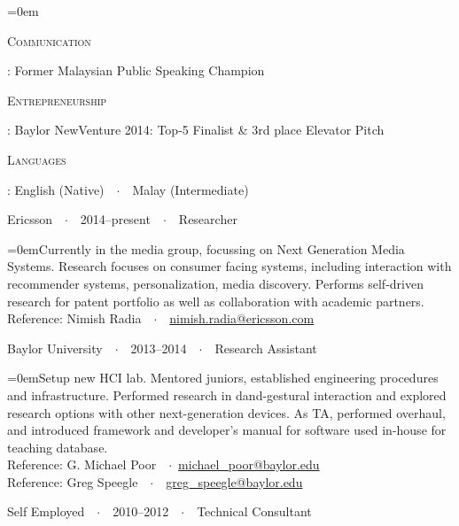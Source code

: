 \documentclass[a4paper]{scrartcl}
\newcommand{\Description}[1]{\hangindent=0em\hangafter=0\noindent\footnotesize{#1}\par\normalsize\vspace{1em}} %
\newcommand{\Redvline}[0]{\vspace{0em}\noindent{\color{ThemeColor}\rule{18cm}{0.4pt}}\vspace{-0.5em}}
\newcommand{\MyName}[1]{\noindent{\textsc{\LARGE{\color{ThemeColor}#1}}}} %
\newcommand{\NewBlock}[3]{
    #1\ \ $\cdotp$\ \ #2\ \ $\cdotp$\ \ #3}
\newcommand{\BlockTitle}[1]{\textsc{\vspace{0.15em}}\noindent{\spacedlowsmallcaps{#1}}\vspace{1em}}
\begin{document}
\Description{\parbox{\nontechskills}{\textsc{Communication}}: Former Malaysian Public Speaking Champion

\parbox{\nontechskills}{\textsc{Entrepreneurship}}: Baylor NewVenture 2014: Top-5 Finalist \& 3rd place Elevator Pitch

\parbox{\nontechskills}{\textsc{Languages}}: English (Native)\ \ $\cdotp$\ \ Malay (Intermediate)
}


\Redvline

\BlockTitle{Work Experience}

\NewBlock{Ericsson}{2014--present}{Researcher}

\Description{Currently in the media group, focussing on Next Generation Media Systems. Research focuses on consumer facing systems, including interaction with recommender systems, personalization, media discovery. Performs self-driven research for patent portfolio as well as collaboration with academic partners.
\\Reference: Nimish Radia\ \ $\cdotp$\ \ \href{mailto:nimish.radia@ericsson.com}{nimish.radia@ericsson.com}}

\NewBlock{Baylor University}{2013--2014}{Research Assistant}

\Description{Setup new HCI lab. Mentored juniors, established engineering procedures and infrastructure. Performed research in dand-gestural interaction and explored research options with other next-generation devices. As TA, performed overhaul, and introduced framework and developer's manual for software used in-house for teaching database. \\
Reference: G. Michael Poor\ \ $\cdotp$\ \href{mailto:michael\_poor@baylor.edu}{michael\_poor@baylor.edu} \\
Reference: Greg Speegle\ \ $\cdotp$\ \ \href{mailto:greg\_speegle@baylor.edu}{greg\_speegle@baylor.edu}}


\NewBlock{Self Employed}{2010--2012}{Technical Consultant}
\end{document}
